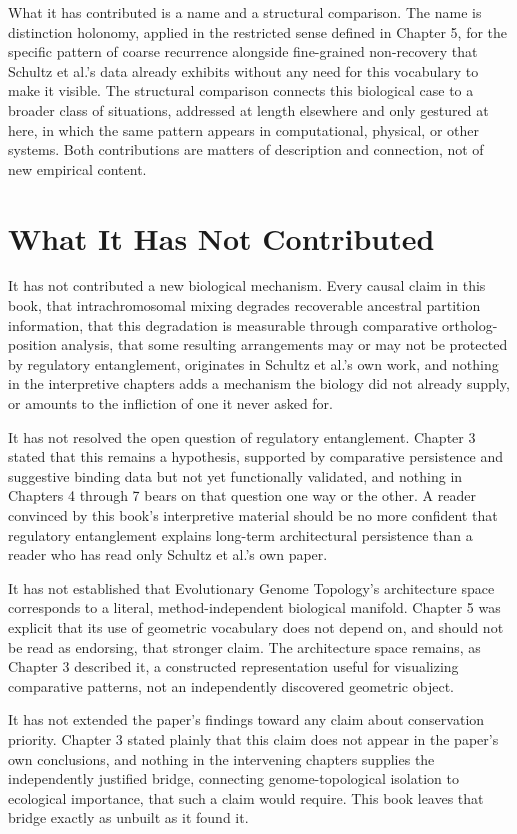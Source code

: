 \documentclass[11pt]{book}
\begin{document}
What it has contributed is a name and a structural comparison. The name is distinction holonomy, applied in the restricted sense defined in Chapter 5, for the specific pattern of coarse recurrence alongside fine-grained non-recovery that Schultz et al.'s data already exhibits without any need for this vocabulary to make it visible. The structural comparison connects this biological case to a broader class of situations, addressed at length elsewhere and only gestured at here, in which the same pattern appears in computational, physical, or other systems. Both contributions are matters of description and connection, not of new empirical content.

\section{What It Has Not Contributed}

It has not contributed a new biological mechanism. Every causal claim in this book, that intrachromosomal mixing degrades recoverable ancestral partition information, that this degradation is measurable through comparative ortholog-position analysis, that some resulting arrangements may or may not be protected by regulatory entanglement, originates in Schultz et al.'s own work, and nothing in the interpretive chapters adds a mechanism the biology did not already supply, or amounts to the infliction of one it never asked for.

It has not resolved the open question of regulatory entanglement. Chapter 3 stated that this remains a hypothesis, supported by comparative persistence and suggestive binding data but not yet functionally validated, and nothing in Chapters 4 through 7 bears on that question one way or the other. A reader convinced by this book's interpretive material should be no more confident that regulatory entanglement explains long-term architectural persistence than a reader who has read only Schultz et al.'s own paper.

It has not established that Evolutionary Genome Topology's architecture space corresponds to a literal, method-independent biological manifold. Chapter 5 was explicit that its use of geometric vocabulary does not depend on, and should not be read as endorsing, that stronger claim. The architecture space remains, as Chapter 3 described it, a constructed representation useful for visualizing comparative patterns, not an independently discovered geometric object.

It has not extended the paper's findings toward any claim about conservation priority. Chapter 3 stated plainly that this claim does not appear in the paper's own conclusions, and nothing in the intervening chapters supplies the independently justified bridge, connecting genome-topological isolation to ecological importance, that such a claim would require. This book leaves that bridge exactly as unbuilt as it found it.
\end{document}
